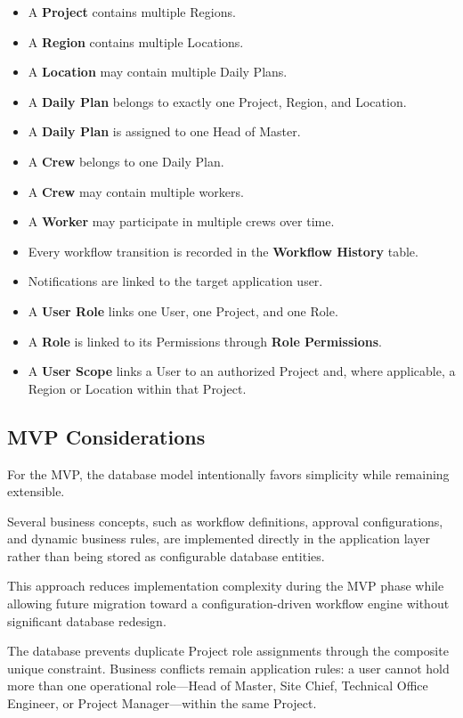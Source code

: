 \documentclass[11pt]{article}
\begin{document}
\begin{itemize}
    \item A \textbf{Project} contains multiple Regions.
    \item A \textbf{Region} contains multiple Locations.
    \item A \textbf{Location} may contain multiple Daily Plans.
    \item A \textbf{Daily Plan} belongs to exactly one Project, Region, and
          Location.
    \item A \textbf{Daily Plan} is assigned to one Head of Master.
    \item A \textbf{Crew} belongs to one Daily Plan.
    \item A \textbf{Crew} may contain multiple workers.
    \item A \textbf{Worker} may participate in multiple crews over time.
    \item Every workflow transition is recorded in the \textbf{Workflow
          History} table.
    \item Notifications are linked to the target application user.
    \item A \textbf{User Role} links one User, one Project, and one Role.
    \item A \textbf{Role} is linked to its Permissions through
          \textbf{Role Permissions}.
    \item A \textbf{User Scope} links a User to an authorized Project and,
          where applicable, a Region or Location within that Project.
\end{itemize}

\subsection{MVP Considerations}

For the MVP, the database model intentionally favors simplicity while remaining
extensible.

Several business concepts, such as workflow definitions, approval
configurations, and dynamic business rules, are implemented directly in the
application layer rather than being stored as configurable database entities.

This approach reduces implementation complexity during the MVP phase while
allowing future migration toward a configuration-driven workflow engine without
significant database redesign.

The database prevents duplicate Project role assignments through the composite
unique constraint. Business conflicts remain application rules: a user cannot
hold more than one operational role---Head of Master, Site Chief, Technical
Office Engineer, or Project Manager---within the same Project.
\end{document}
